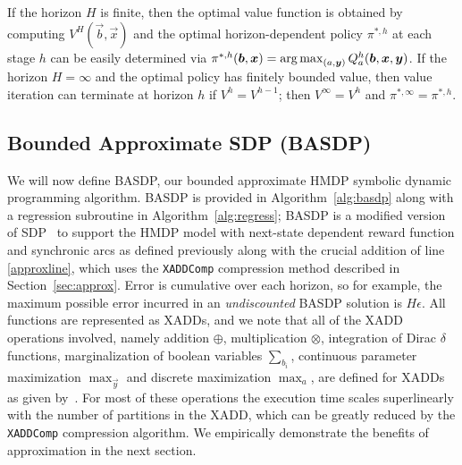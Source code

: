 If the horizon $H$ is finite, then the optimal value function is
obtained by computing $V^H(\vec{b},\vec{x})$ and the optimal
horizon-dependent policy $\pi^{*,h}$ at each stage $h$ can be easily
determined via $\pi^{*,h}(\vec{b},\vec{x}) = \argmax_{(a, \vec{y} )}
Q^h_a(\vec{b},\vec{x},\vec{y})$.  If the horizon $H = \infty$ and the
optimal policy has finitely bounded value, then value iteration can
terminate at horizon $h$ if $V^{h} = V^{h-1}$; then $V^\infty = V^h$
and $\pi^{*,\infty} = \pi^{*,h}$.

\subsection{Bounded Approximate SDP (BASDP)}

We will now define BASDP, our bounded approximate HMDP symbolic
dynamic programming algorithm.  BASDP is provided in
Algorithm~\ref{alg:basdp} along with a regression subroutine in
Algorithm~\ref{alg:regress}; BASDP is a modified version of
SDP~\cite{zamani12} to support the HMDP model with next-state
dependent reward function and synchronic arcs as defined previously 
along with the crucial addition of line \ref{approxline}, which uses
the \texttt{XADDComp} compression method described in
Section~\ref{sec:approx}.  Error is cumulative over each horizon, so for example,
the maximum possible error incurred in an \emph{undiscounted} BASDP solution
is $H\epsilon$.
All functions are represented as XADDs, and we note that all of the
XADD operations involved, namely addition $\oplus$, multiplication
$\otimes$, integration of Dirac $\delta$ functions, marginalization of
boolean variables $\sum_{b_i}$, continuous parameter maximization
$\max_{\vec{y}}$ and discrete maximization $\max_a$, are defined for
XADDs as given by~\cite{sanner_uai11,zamani12}.  For most of these
operations the execution time scales superlinearly with the number of
partitions in the XADD, which can be greatly reduced by
the \texttt{XADDComp} compression algorithm.  We empirically
demonstrate the benefits of approximation in the next section.
